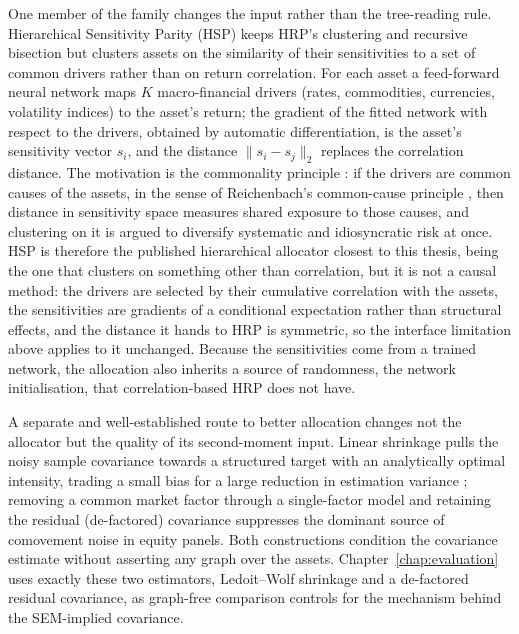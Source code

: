 One member of the family changes the input rather than the tree-reading
rule. Hierarchical Sensitivity Parity (HSP) \cite{rodriguez2023hsp} keeps
HRP's clustering and recursive bisection but clusters assets on the
similarity of their sensitivities to a set of common drivers rather than
on return correlation. For each asset a feed-forward neural network maps
$K$ macro-financial drivers (rates, commodities, currencies, volatility
indices) to the asset's return; the gradient of the fitted network with
respect to the drivers, obtained by automatic differentiation, is the
asset's sensitivity vector $s_i$, and the distance $\lVert s_i - s_j
\rVert_2$ replaces the correlation distance. The motivation is the
commonality principle \cite{rodriguez2023hsp,rodriguez2025causal}: if the
drivers are common causes of the assets, in the sense of Reichenbach's
common-cause principle \cite{hitchcock2020reichenbach}, then distance in
sensitivity space measures shared exposure to those causes, and clustering
on it is argued to diversify systematic and idiosyncratic risk at once.
HSP is therefore the published hierarchical allocator closest to this
thesis, being the one that clusters on something other than correlation,
but it is not a causal method: the drivers are selected by their
cumulative correlation with the assets, the sensitivities are gradients of
a conditional expectation rather than structural effects, and the distance
it hands to HRP is symmetric, so the interface limitation above applies to
it unchanged. Because the sensitivities come from a trained network, the
allocation also inherits a source of randomness, the network
initialisation, that correlation-based HRP does not have.

A separate and well-established route to better allocation changes not the
allocator but the quality of its second-moment input. Linear shrinkage pulls
the noisy sample covariance towards a structured target with an analytically
optimal intensity, trading a small bias for a large reduction in estimation
variance \cite{ledoitwolf2004}; removing a common market factor through a
single-factor model and retaining the residual (de-factored) covariance
suppresses the dominant source of comovement noise in equity panels. Both
constructions condition the covariance estimate without asserting any graph
over the assets. Chapter~\ref{chap:evaluation} uses exactly these two
estimators, Ledoit--Wolf shrinkage and a de-factored residual covariance, as
graph-free comparison controls for the mechanism behind the SEM-implied
covariance.

